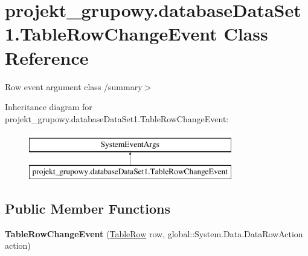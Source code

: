 \hypertarget{classprojekt__grupowy_1_1database_data_set1_1_1_table_row_change_event}{}\section{projekt\+\_\+grupowy.\+database\+Data\+Set1.\+Table\+Row\+Change\+Event Class Reference}
\label{classprojekt__grupowy_1_1database_data_set1_1_1_table_row_change_event}


Row event argument class /summary$>$  


Inheritance diagram for projekt\+\_\+grupowy.\+database\+Data\+Set1.\+Table\+Row\+Change\+Event\+:\begin{figure}[H]
\begin{center}
\leavevmode
\includegraphics[height=2.000000cm]{classprojekt__grupowy_1_1database_data_set1_1_1_table_row_change_event}
\end{center}
\end{figure}
\subsection*{Public Member Functions}
\begin{DoxyCompactItemize}
\item 
\mbox{\label{classprojekt__grupowy_1_1database_data_set1_1_1_table_row_change_event_a03c7dbcda15c031f6ad8d63ad94400fd}} 
{\bfseries Table\+Row\+Change\+Event} (\hyperlink{classprojekt__grupowy_1_1database_data_set1_1_1_table_row}{Table\+Row} row, global\+::\+System.\+Data.\+Data\+Row\+Action action)
\end{DoxyCompactItemize}
